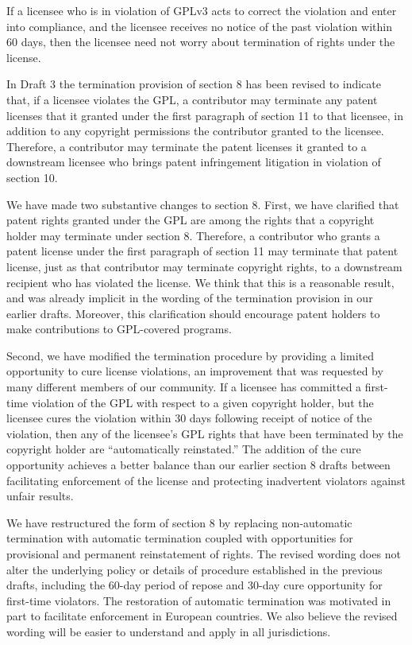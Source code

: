
If a licensee who is in violation of GPLv3 acts to correct the violation and
enter into compliance, and the licensee receives no notice of the past
violation within 60 days, then the licensee need not worry about termination
of rights under the license.

In Draft 3 the termination provision of section 8 has been revised to
indicate that, if a licensee violates the GPL, a contributor may terminate
any patent licenses that it granted under the first paragraph of section 11
to that licensee, in addition to any copyright permissions the contributor
granted to the licensee.  Therefore, a contributor may terminate the patent
licenses it granted to a downstream licensee who brings patent infringement
litigation in violation of section 10.

We have made two substantive changes to section 8.  First, we have clarified
that patent rights granted under the GPL are among the rights that a
copyright holder may terminate under section 8.  Therefore, a contributor who
grants a patent license under the first paragraph of section 11 may terminate
that patent license, just as that contributor may terminate copyright rights,
to a downstream recipient who has violated the license.  We think that this
is a reasonable result, and was already implicit in the wording of the
termination provision in our earlier drafts.  Moreover, this clarification
should encourage patent holders to make contributions to GPL-covered
programs.

Second, we have modified the termination procedure by providing a limited
opportunity to cure license violations, an improvement that was requested by
many different members of our community.  If a licensee has committed a
first-time violation of the GPL with respect to a given copyright holder, but
the licensee cures the violation within 30 days following receipt of notice
of the violation, then any of the licensee's GPL rights that have been
terminated by the copyright holder are ``automatically reinstated.''  The
addition of the cure opportunity achieves a better balance than our earlier
section 8 drafts between facilitating enforcement of the license and
protecting inadvertent violators against unfair results.

We have restructured the form of section 8 by replacing non-automatic
termination with automatic termination coupled with opportunities for
provisional and permanent reinstatement of rights.  The revised wording does
not alter the underlying policy or details of procedure established in the
previous drafts, including the 60-day period of repose and 30-day cure
opportunity for first-time violators.  The restoration of automatic
termination was motivated in part to facilitate enforcement in European
countries.  We also believe the revised wording will be easier to understand
and apply in all jurisdictions.

